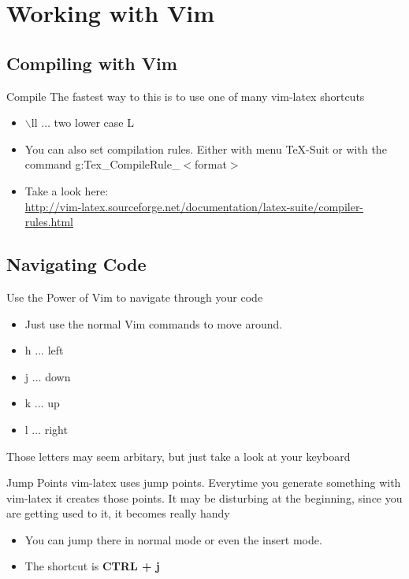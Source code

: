 \documentclass[aspectratio=169]{beamer}
\begin{document}
\section{Working with Vim}
\subsection{Compiling with Vim}
\begin{frame}[fragile]{Compile}
  The fastest way to this is to use one of many vim-latex shortcuts
  \begin{itemize}
    \item $\backslash$ll $\ldots$ two lower case L
    \item You can also set compilation rules. Either with menu TeX-Suit or with the command g:Tex\_CompileRule\_$<$format$>$
    \item Take a look here:\\ \url{http://vim-latex.sourceforge.net/documentation/latex-suite/compiler-rules.html}
  \end{itemize}
\end{frame}
\subsection{Navigating Code}
\begin{frame}{Use the Power of Vim to navigate through your code}
  \begin{itemize}
    \item Just use the normal Vim commands to move around.
    \item h $\ldots$ left
    \item j $\ldots$ down
    \item k $\ldots$ up
    \item l $\ldots$ right
  \end{itemize}
  \vspace{0.5cm}
  Those letters may seem arbitary, but just take a look at your keyboard \Winkey
\end{frame}
\begin{frame}{Jump Points}
  vim-latex uses jump points. Everytime you generate something with vim-latex it creates those points. It may be disturbing at the beginning, since you are getting used to it, it becomes really handy
  \begin{itemize}
    \item You can jump there in normal mode or even the insert mode.
    \item The shortcut is \textbf{CTRL + j}
  \end{itemize}
\end{frame}
\end{document}
